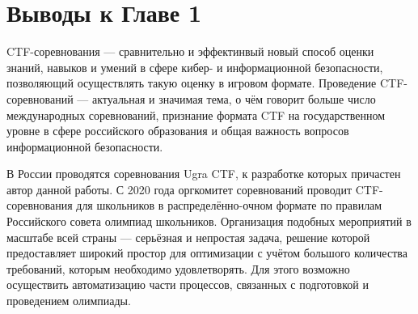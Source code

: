 \chapter*{Выводы к Главе 1}

CTF-соревнования — сравнительно и эффектинвый новый способ оценки знаний, навыков и умений в сфере кибер- и информационной безопасности, позволяющий осуществлять такую оценку в игровом формате. Проведение CTF-соревнований — актуальная и значимая тема, о чём говорит больше число международных соревнований, признание формата CTF на государственном уровне в сфере российского образования и общая важность вопросов информационной безопасности.

В России проводятся соревнования Ugra CTF, к разработке которых причастен автор данной работы. С 2020 года оргкомитет соревнований проводит CTF-соревнования для школьников в распределённо-очном формате по правилам Российского совета олимпиад школьников. Организация подобных мероприятий в масштабе всей страны — серьёзная и непростая задача, решение которой предоставляет широкий простор для оптимизации с учётом большого количества требований, которым необходимо удовлетворять. Для этого возможно осуществить автоматизацию части процессов, связанных с подготовкой и проведением олимпиады.





